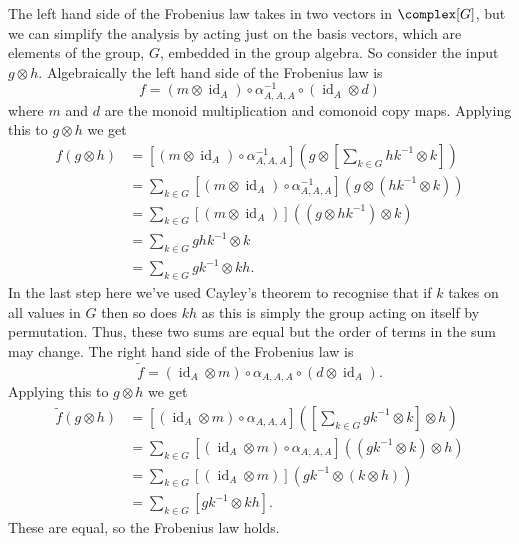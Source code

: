 \documentclass[fleqn]{NotesClass}
\DeclareMathOperator{\id}{id}
\begin{document}
    The left hand side of the Frobenius law takes in two vectors in \(\complex[G]\), but we can simplify the analysis by acting just on the basis vectors, which are elements of the group, \(G\), embedded in the group algebra.
    So consider the input \(g \otimes h\).
    Algebraically the left hand side of the Frobenius law is
    \begin{equation}
        f = (m \otimes \id_A) \circ \alpha_{A,A,A}^{-1} \circ ({\id_A} \otimes d)
    \end{equation}
    where \(m\) and \(d\) are the monoid multiplication and comonoid copy maps.
    Applying this to \(g \otimes h\) we get
    \begingroup\allowdisplaybreaks
    \begin{align}
        f(g \otimes h) &= [(m \otimes \id_A) \circ \alpha_{A,A,A}^{-1}]\left( g \otimes \left[ \sum_{k\in G} hk^{-1} \otimes k \right] \right)\\
        &= \sum_{k\in G} [(m \otimes \id_A) \circ \alpha_{A,A,A}^{-1}](g \otimes (hk^{-1} \otimes k))\\
        &= \sum_{k\in G} [(m \otimes \id_A)]((g \otimes hk^{-1}) \otimes k)\\
        &= \sum_{k\in G} ghk^{-1} \otimes k\\
        &= \sum_{k\in G} gk^{-1} \otimes kh.
    \end{align}
    \endgroup
    In the last step here we've used Cayley's theorem to recognise that if \(k\) takes on all values in \(G\) then so does \(kh\) as this is simply the group acting on itself by permutation.
    Thus, these two sums are equal but the order of terms in the sum may change.
    The right hand side of the Frobenius law is
    \begin{equation}
        \tilde{f} = ({\id_A} \otimes m) \circ \alpha_{A,A,A} \circ (d \otimes \id_A).
    \end{equation}
    Applying this to \(g \otimes h\) we get
    \begin{align}
        \tilde{f}(g \otimes h) &= [({\id_A} \otimes m) \circ \alpha_{A,A,A}]\left( \left[ \sum_{k\in G} gk^{-1} \otimes k \right] \otimes h \right)\\
        &= \sum_{k\in G} [({\id_A} \otimes m) \circ \alpha_{A,A,A}]( (gk^{-1} \otimes k) \otimes h )\\
        &= \sum_{k\in G} [({\id_A} \otimes m)](gk^{-1} \otimes (k \otimes h))\\
        &= \sum_{k\in G} [gk^{-1} \otimes kh].
    \end{align}
    These are equal, so the Frobenius law holds.
    
\end{document}
